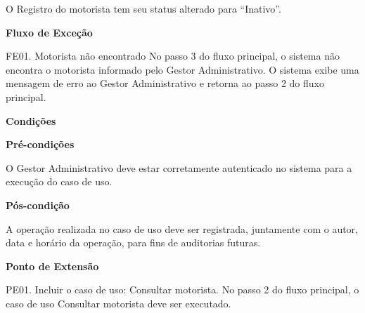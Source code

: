     O Registro do motorista tem seu status alterado para “Inativo”.
    
    \vfill
    \pagebreak
    
   {\raggedright
      \textbf{Fluxo de Exceção}
   }
	
    FE01. Motorista não encontrado
	No passo 3 do fluxo principal, o sistema não encontra o motorista informado pelo Gestor Administrativo. O sistema exibe uma
	mensagem de erro ao Gestor Administrativo e retorna ao passo 2 do fluxo principal.

	
   {\raggedright
      \textbf{Condições}
   }
   
    
   \textbf{Pré-condições}
   
   O Gestor Administrativo deve estar corretamente autenticado no sistema para a execução do caso de uso.
   
   \textbf{Pós-condição}
   
   A operação realizada no caso de uso deve ser registrada, juntamente com o autor, data e horário da operação, para fins de auditorias futuras.


   {\raggedright
      \textbf{Ponto de Extensão}
   }
   
   
    PE01. Incluir o caso de uso: Consultar motorista.
	    No passo 2 do fluxo principal, o caso de uso Consultar motorista deve ser executado.
   


  \vfill
  \pagebreak
